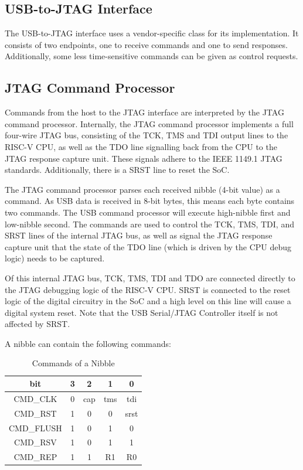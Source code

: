 \documentclass[main\_\_EN.tex]{subfiles}
\begin{document}
\subsection{USB-to-JTAG Interface}    

The USB-to-JTAG interface uses a vendor-specific class for its implementation. It consists of two endpoints, one to receive commands and one to send responses. Additionally, some less time-sensitive commands can be given as control requests.

\subsection{JTAG Command Processor}    

Commands from the host to the JTAG interface are interpreted by the JTAG command processor. Internally, the JTAG command processor implements a full four-wire JTAG bus, consisting of the TCK, TMS and TDI output lines to the RISC-V CPU, as well as the TDO line signalling back from the CPU to the JTAG response capture unit. These signals adhere to the IEEE 1149.1 JTAG standards. Additionally, there is a SRST line to reset the SoC.

The JTAG command processor parses each received nibble (4-bit value) as a command. As USB data is received in 8-bit bytes, this means each byte contains two commands. The USB command processor will execute high-nibble first and low-nibble second. The commands are used to control the TCK, TMS, TDI, and SRST lines of the internal JTAG bus, as well as signal the JTAG response capture unit that the state of the TDO line (which is driven by the CPU debug logic) needs to be captured.

Of this internal JTAG bus, TCK, TMS, TDI and TDO are connected directly to the JTAG debugging logic of the RISC-V CPU. SRST is connected to the reset logic of the digital circuitry in the SoC and a high level on this line will cause a digital system reset. Note that the USB Serial/JTAG Controller itself is not affected by SRST.

A nibble can contain the following commands:


\begin{table}[H]
    \centering
    \caption{Commands of a Nibble}
    \label{tab:usbserialjtag-commands-of-a-nibble}
    
    \begin{tabular}{|c|c c c c|}
    \hline
        \rowcolor{lightgray}
        \textbf{bit} & \textbf{3} & \textbf{2} & \textbf{1} & \textbf{0}
        \\\hline
        
        CMD\_CLK & 0 &  cap & tms & tdi \\\hline
        CMD\_RST & 1 & 0 & 0 & srst \\\hline
        CMD\_FLUSH & 1 & 0 & 1 & 0 \\\hline
        CMD\_RSV & 1 & 0 & 1 & 1 \\\hline
        CMD\_REP & 1 & 1 & R1 & R0 \\\hline
    \end{tabular}
\end{table}
\end{document}
